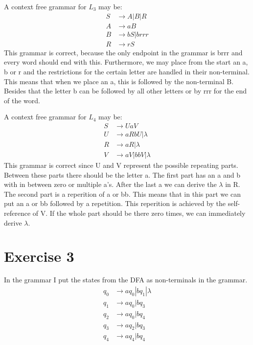 \documentclass{article}
\begin{document}
A context free grammar for $L_3$ may be:
\begin{align*}
  S &\rightarrow A | B | R \\
  A &\rightarrow aB \\
  B &\rightarrow bS | brrr \\
  R &\rightarrow rS
\end{align*}
This grammar is correct, because the only endpoint in the grammar is brrr and every word should end with this. Furthermore, we may place from the start an a, b or r and the restrictions for the certain letter are handled in their non-terminal. This means that when we place an a, this is followed by the non-terminal B. Besides that the letter b can be followed by all other letters or by rrr for the end of the word.

A context free grammar for $L_4$ may be:
\begin{align*}
  S &\rightarrow UaV\\
  U &\rightarrow aRbU | \lambda \\
  R &\rightarrow aR | \lambda \\
  V &\rightarrow aV | bbV | \lambda
\end{align*}
This grammar is correct since U and V represent the possible repeating parts. Between these parts there should be the letter a. The first part has an a and b with in between zero or multiple a's. After the last a we can derive the $\lambda$ in R. The second part is a reperition of a or bb. This means that in this part we can put an a or bb followed by a repetition. This reperition is achieved by the self-reference of V. If the whole part should be there zero times, we can immediately derive $\lambda$.

\section*{Exercise 3}
In the grammar I put the states from the DFA as non-terminals in the grammar.
\begin{align*}
  q_0 &\rightarrow aq_0 | bq_1 | \lambda \\
  q_1 &\rightarrow aq_0 | bq_3 \\
  q_2 &\rightarrow aq_0 | bq_4 \\
  q_3 &\rightarrow aq_2 | bq_3 \\
  q_4 &\rightarrow aq_4 | bq_4
\end{align*}
\end{document}
